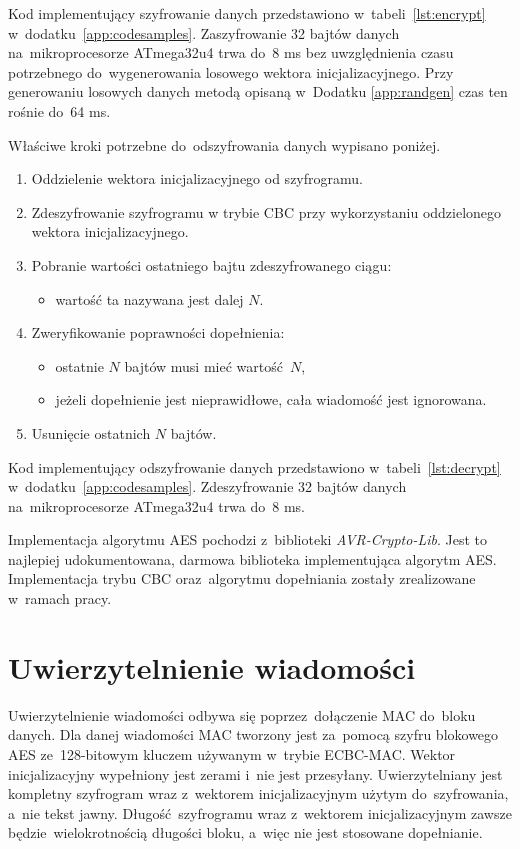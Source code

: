 Kod implementujący szyfrowanie danych przedstawiono w~tabeli~\ref{lst:encrypt} w~dodatku~\ref{app:codesamples}. Zaszyfrowanie 32 bajtów danych na~mikroprocesorze ATmega32u4 trwa do~8 ms bez uwzględnienia czasu potrzebnego do~wygenerowania losowego wektora inicjalizacyjnego. Przy generowaniu losowych danych metodą opisaną w~Dodatku \ref{app:randgen} czas ten rośnie do~64 ms.

Właściwe kroki potrzebne do~odszyfrowania danych wypisano poniżej.

\begin{enumerate}
\item Oddzielenie wektora inicjalizacyjnego od szyfrogramu.
\item Zdeszyfrowanie szyfrogramu w trybie CBC przy wykorzystaniu oddzielonego wektora inicjalizacyjnego.
\item Pobranie wartości ostatniego bajtu zdeszyfrowanego ciągu:
\begin{itemize}
    \item wartość ta nazywana jest dalej $ N $.
\end{itemize}
\item Zweryfikowanie poprawności dopełnienia:
\begin{itemize}
    \item ostatnie $ N $ bajtów musi mieć wartość $ N $,
    \item jeżeli dopełnienie jest nieprawidłowe, cała wiadomość jest ignorowana.
\end{itemize}
\item Usunięcie ostatnich $ N $ bajtów.
\end{enumerate}

Kod implementujący odszyfrowanie danych przedstawiono w~tabeli~\ref{lst:decrypt} w~dodatku~\ref{app:codesamples}. Zdeszyfrowanie 32 bajtów danych na~mikroprocesorze ATmega32u4 trwa do~8 ms.

Implementacja algorytmu AES pochodzi z~biblioteki \emph{AVR-Crypto-Lib}. Jest to najlepiej udokumentowana, darmowa biblioteka implementująca algorytm AES. Implementacja trybu CBC oraz~algorytmu dopełniania zostały zrealizowane w~ramach pracy.

\section{Uwierzytelnienie wiadomości}
\label{sec:auth}


Uwierzytelnienie wiadomości odbywa się poprzez~dołączenie MAC do~bloku danych. Dla danej wiadomości MAC tworzony jest za~pomocą szyfru blokowego AES ze~128-bitowym kluczem używanym w~trybie ECBC-MAC. Wektor inicjalizacyjny wypełniony jest zerami i~nie jest przesyłany. Uwierzytelniany jest kompletny szyfrogram wraz z~wektorem inicjalizacyjnym użytym do~szyfrowania, a~nie tekst jawny. Długość szyfrogramu wraz z~wektorem inicjalizacyjnym zawsze będzie wielokrotnością długości bloku, a~więc nie jest stosowane dopełnianie.

